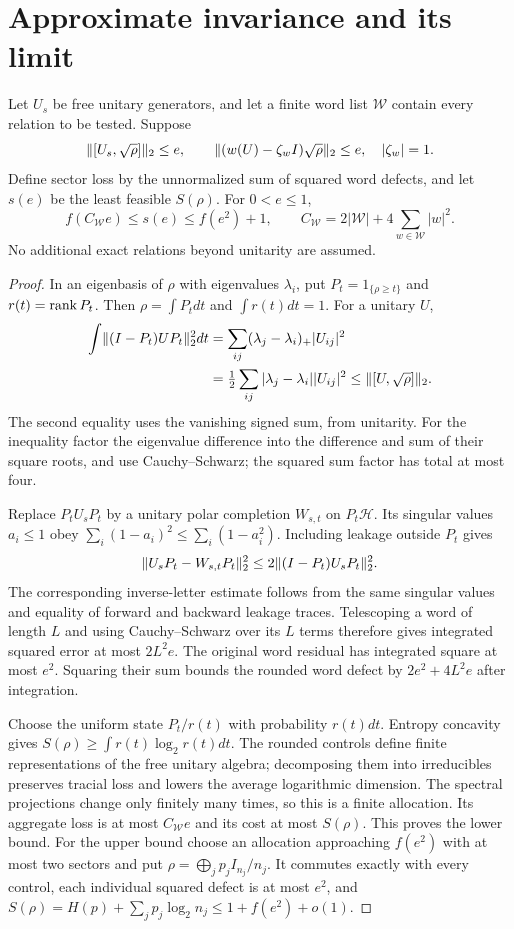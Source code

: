 \section{Approximate invariance and its limit}\label{app:rounding}
\begin{proposition}\label{prop:rounding}
Let $U_s$ be free unitary generators, and let a finite word list $\mathcal W$ contain every relation to be tested. Suppose
\[
 \lVert[U_s,\sqrt\rho]\rVert_2\le e,\qquad
 \lVert(w(U)-\zeta_wI)\sqrt\rho\rVert_2\le e,\quad |\zeta_w|=1.
\]
Define sector loss by the unnormalized sum of squared word defects, and let $s(e)$ be the least feasible $S(\rho)$. For $0<e\le1$,
\[
 f(C_{\mathcal W}e)\le s(e)\le f(e^2)+1,\qquad
 C_{\mathcal W}=2|\mathcal W|+4\sum_{w\in\mathcal W}|w|^2.
\]
No additional exact relations beyond unitarity are assumed.
\end{proposition}
\begin{proof}
In an eigenbasis of $\rho$ with eigenvalues $\lambda_i$, put $P_t=1_{\{\rho\ge t\}}$ and $r(t)=\operatorname{rank} P_t$. Then $\rho=\int P_tdt$ and $\int r(t)dt=1$. For a unitary $U$,
\begin{align*}
 \int\lVert(I-P_t)UP_t\rVert_2^2dt
 &=\sum_{ij}(\lambda_j-\lambda_i)_+|U_{ij}|^2\\
 &=\tfrac12\sum_{ij}|\lambda_j-\lambda_i||U_{ij}|^2
 \le\lVert[U,\sqrt\rho]\rVert_2.
\end{align*}
The second equality uses the vanishing signed sum, from unitarity. For the inequality factor the eigenvalue difference into the difference and sum of their square roots, and use Cauchy--Schwarz; the squared sum factor has total at most four.

Replace $P_tU_sP_t$ by a unitary polar completion $W_{s,t}$ on $P_t\mathcal H$. Its singular values $a_i\le1$ obey $\sum_i(1-a_i)^2\le\sum_i(1-a_i^2)$. Including leakage outside $P_t$ gives
\[
 \lVert U_sP_t-W_{s,t}P_t\rVert_2^2\le2\lVert(I-P_t)U_sP_t\rVert_2^2.
\]
The corresponding inverse-letter estimate follows from the same singular values and equality of forward and backward leakage traces. Telescoping a word of length $L$ and using Cauchy--Schwarz over its $L$ terms therefore gives integrated squared error at most $2L^2e$. The original word residual has integrated square at most $e^2$. Squaring their sum bounds the rounded word defect by $2e^2+4L^2e$ after integration.

Choose the uniform state $P_t/r(t)$ with probability $r(t)dt$. Entropy concavity gives $S(\rho)\ge\int r(t)\log_2r(t)dt$. The rounded controls define finite representations of the free unitary algebra; decomposing them into irreducibles preserves tracial loss and lowers the average logarithmic dimension. The spectral projections change only finitely many times, so this is a finite allocation. Its aggregate loss is at most $C_{\mathcal W}e$ and its cost at most $S(\rho)$. This proves the lower bound. For the upper bound choose an allocation approaching $f(e^2)$ with at most two sectors and put $\rho=\bigoplus_jp_jI_{n_j}/n_j$. It commutes exactly with every control, each individual squared defect is at most $e^2$, and $S(\rho)=H(p)+\sum_jp_j\log_2n_j\le1+f(e^2)+o(1)$.
\end{proof}

